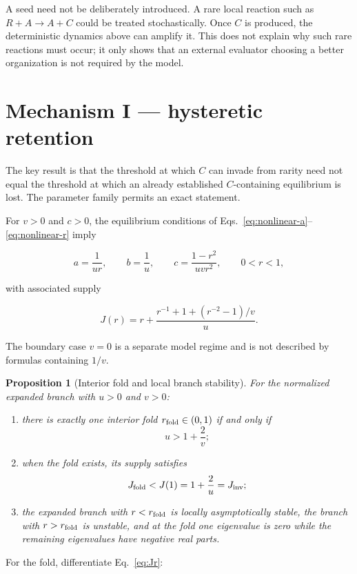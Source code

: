 \documentclass[11pt,a4paper]{article}
\newtheorem{proposition}{Proposition}
\begin{document}
A seed need not be deliberately introduced. A rare local reaction such as $R+A\to A+C$ could be treated stochastically. Once $C$ is produced, the deterministic dynamics above can amplify it. This does not explain why such rare reactions must occur; it only shows that an external evaluator choosing a better organization is not required by the model.

\section{Mechanism I --- hysteretic retention}

The key result is that the threshold at which $C$ can invade from rarity need not equal the threshold at which an already established $C$-containing equilibrium is lost. The parameter family permits an exact statement.

For $v>0$ and $c>0$, the equilibrium conditions of Eqs.~\eqref{eq:nonlinear-a}--\eqref{eq:nonlinear-r} imply

\[
a=\frac{1}{ur},
\qquad
b=\frac{1}{u},
\qquad
c=\frac{1-r^2}{uvr^2},
\qquad
0<r<1,
\]

with associated supply

\begin{equation}
J(r)
=
r+
\frac{r^{-1}+1+(r^{-2}-1)/v}{u}.
\label{eq:Jr}
\end{equation}

The boundary case $v=0$ is a separate model regime and is not described by formulas containing $1/v$.

\begin{proposition}[Interior fold and local branch stability]
For the normalized expanded branch with $u>0$ and $v>0$:
\begin{enumerate}[label=(\roman*)]
\item there is exactly one interior fold $r_{\rm fold}\in(0,1)$ if and only if
\[
\boxed{u>1+\frac{2}{v}};
\]
\item when the fold exists, its supply satisfies
\[
J_{\rm fold}<J(1)=1+\frac{2}{u}=J_{\rm inv};
\]
\item the expanded branch with $r<r_{\rm fold}$ is locally asymptotically stable, the branch with $r>r_{\rm fold}$ is unstable, and at the fold one eigenvalue is zero while the remaining eigenvalues have negative real parts.
\end{enumerate}
\label{prop:fold-stability}
\end{proposition}

For the fold, differentiate Eq.~\eqref{eq:Jr}:
\end{document}
